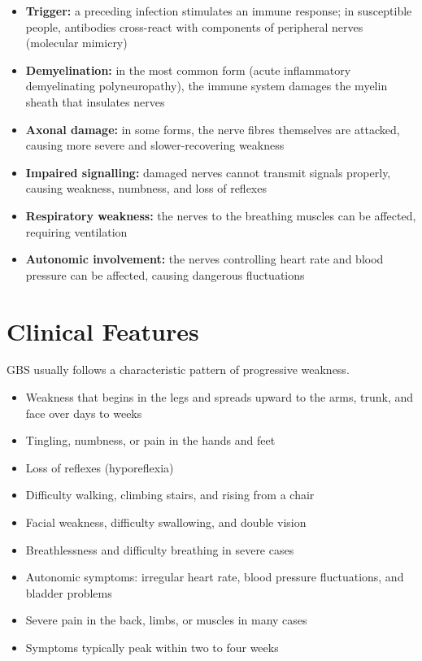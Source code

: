 \begin{itemize}
    \item \textbf{Trigger:} a preceding infection stimulates an immune response; in susceptible people, antibodies cross-react with components of peripheral nerves (molecular mimicry)
    \item \textbf{Demyelination:} in the most common form (acute inflammatory demyelinating polyneuropathy), the immune system damages the myelin sheath that insulates nerves
    \item \textbf{Axonal damage:} in some forms, the nerve fibres themselves are attacked, causing more severe and slower-recovering weakness
    \item \textbf{Impaired signalling:} damaged nerves cannot transmit signals properly, causing weakness, numbness, and loss of reflexes
    \item \textbf{Respiratory weakness:} the nerves to the breathing muscles can be affected, requiring ventilation
    \item \textbf{Autonomic involvement:} the nerves controlling heart rate and blood pressure can be affected, causing dangerous fluctuations
\end{itemize}

\section*{Clinical Features}
GBS usually follows a characteristic pattern of progressive weakness.

\begin{itemize}
    \item Weakness that begins in the legs and spreads upward to the arms, trunk, and face over days to weeks
    \item Tingling, numbness, or pain in the hands and feet
    \item Loss of reflexes (hyporeflexia)
    \item Difficulty walking, climbing stairs, and rising from a chair
    \item Facial weakness, difficulty swallowing, and double vision
    \item Breathlessness and difficulty breathing in severe cases
    \item Autonomic symptoms: irregular heart rate, blood pressure fluctuations, and bladder problems
    \item Severe pain in the back, limbs, or muscles in many cases
    \item Symptoms typically peak within two to four weeks
\end{itemize}

